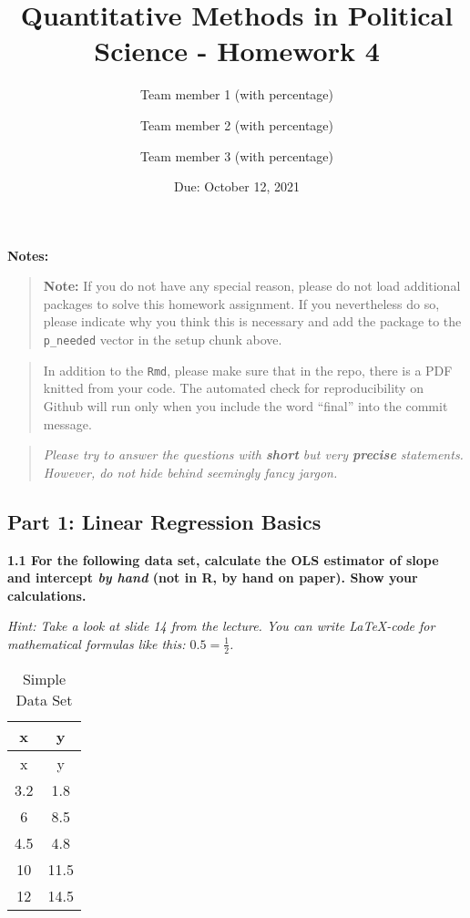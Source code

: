 \documentclass[
]{article}
\title{Quantitative Methods in Political Science - Homework 4}
\author{Team member 1 (with percentage) \and Team member 2 (with
percentage) \and Team member 3 (with percentage)}
\date{Due: October 12, 2021}
\begin{document}
\maketitle

{
\setcounter{tocdepth}{2}
\tableofcontents
}
\textbf{Notes:}

\begin{quote}
\textbf{Note:} If you do not have any special reason, please do not load
additional packages to solve this homework assignment. If you
nevertheless do so, please indicate why you think this is necessary and
add the package to the \texttt{p\_needed} vector in the setup chunk
above.
\end{quote}

\begin{quote}
In addition to the \texttt{Rmd}, please make sure that in the repo,
there is a PDF knitted from your code. The automated check for
reproducibility on Github will run only when you include the word
``final'' into the commit message.
\end{quote}

\begin{quote}
\emph{Please try to answer the questions with \textbf{short} but very
\textbf{precise} statements. However, do not hide behind seemingly fancy
jargon.}
\end{quote}

\hypertarget{part-1-linear-regression-basics}{%
\subsection{Part 1: Linear Regression
Basics}\label{part-1-linear-regression-basics}}

\textbf{1.1 For the following data set, calculate the OLS estimator of
slope and intercept \emph{by hand} (not in R, by hand on paper). Show
your calculations.}

\emph{Hint: Take a look at slide 14 from the lecture. You can write
LaTeX-code for mathematical formulas like this: \(0.5 = \frac{1}{2}\).}

\begin{longtable}[]{@{}cc@{}}
\caption{Simple Data Set}\tabularnewline
\toprule
x & y \\
\midrule
\endfirsthead
\toprule
x & y \\
\midrule
\endhead
3.2 & 1.8 \\
6 & 8.5 \\
4.5 & 4.8 \\
10 & 11.5 \\
12 & 14.5 \\
\bottomrule
\end{longtable}
\end{document}
